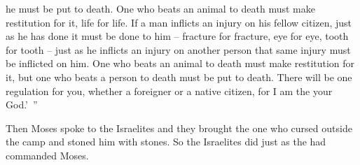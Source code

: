 {he must be put to death.
One who beats
an animal
to death
must make restitution
for it, life
for
life.
If
a man
inflicts
an injury
on his fellow citizen,
just
as he has done
it must be done to him –
fracture
for
fracture,
eye
for
eye,
tooth
for
tooth
– just
as he inflicts
an injury
on another person
that same
injury must be inflicted on him.
One who beats
an animal
to death must make restitution
for it, but one who beats
a person
to death must be put to death.
There will be
one
regulation
for you, whether a foreigner
or a native citizen,
for
I am
the {}
your God.’ ”
\par }{\PP {}Then
Moses
spoke
to
the Israelites
and they brought
the one who cursed
outside
the camp
and stoned
him with stones.
So the Israelites
did
just
as the
{}
had commanded
Moses.

}
